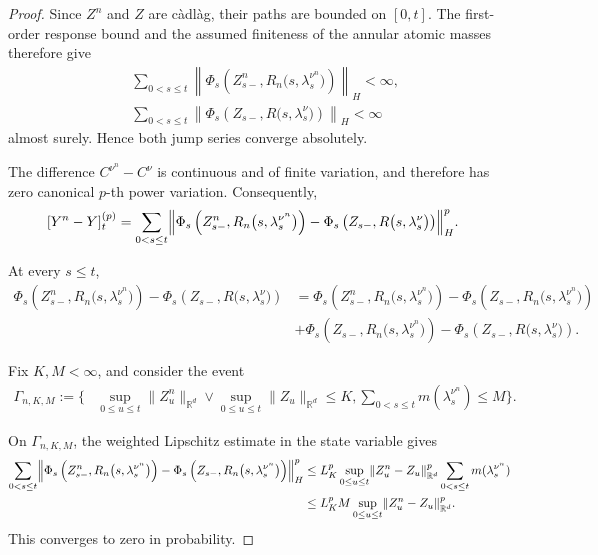 \documentclass[a4paper,10pt]{article}
\begin{document}
\begin{proof}
Since \(Z^n\) and \(Z\) are càdlàg, their paths are bounded on
\([0,t]\). The first-order response bound and the assumed finiteness
of the annular atomic masses therefore give
\[
\begin{aligned}
&\sum_{0<s\le t}
\left\lVert
\Phi_s\left(
Z_{s-}^n,
R_n\bigl(s,\lambda_s^{\nu^n}\bigr)
\right)
\right\rVert_H
<\infty,
\\
&\sum_{0<s\le t}
\left\lVert
\Phi_s\left(
Z_{s-},
R\bigl(s,\lambda_s^\nu\bigr)
\right)
\right\rVert_H
<\infty
\end{aligned}
\]
almost surely. Hence both jump series converge absolutely.

The difference \(C^{\nu^n}-C^\nu\) is continuous and of finite
variation, and therefore has zero canonical \(p\)-th power variation.
Consequently,
\[
\begin{aligned}
[Y^n-Y]^{(p)}_t
&=
\sum_{0<s\le t}
\Bigl\lVert
\Phi_s\left(
Z_{s-}^n,
R_n\bigl(s,\lambda_s^{\nu^n}\bigr)
\right)
-
\Phi_s\left(
Z_{s-},
R\bigl(s,\lambda_s^\nu\bigr)
\right)
\Bigr\rVert_H^p.
\end{aligned}
\]

At every \(s\le t\),
\[
\begin{aligned}
\Phi_s\left(
Z_{s-}^n,
R_n\bigl(s,\lambda_s^{\nu^n}\bigr)
\right)
-
\Phi_s\left(
Z_{s-},
R\bigl(s,\lambda_s^\nu\bigr)
\right)
&=
\Phi_s\left(
Z_{s-}^n,
R_n\bigl(s,\lambda_s^{\nu^n}\bigr)
\right)
-
\Phi_s\left(
Z_{s-},
R_n\bigl(s,\lambda_s^{\nu^n}\bigr)
\right)
\\
&+
\Phi_s\left(
Z_{s-},
R_n\bigl(s,\lambda_s^{\nu^n}\bigr)
\right)
-
\Phi_s\left(
Z_{s-},
R\bigl(s,\lambda_s^\nu\bigr)
\right).
\end{aligned}
\]

Fix \(K,M<\infty\), and consider the event
\[
\begin{aligned}
\Gamma_{n,K,M}
:=
\Biggl\{
&\sup_{0\le u\le t}\lVert Z_u^n\rVert_{\mathbb R^d}
\vee
\sup_{0\le u\le t}\lVert Z_u\rVert_{\mathbb R^d}
\le K,
\sum_{0<s\le t}m(\lambda_s^{\nu^n})
\le M
\Biggr\}.
\end{aligned}
\]

On \(\Gamma_{n,K,M}\), the weighted Lipschitz estimate in the state
variable gives
\[
\begin{aligned}
\sum_{0<s\le t}
\Bigl\lVert
\Phi_s\left(
Z_{s-}^n,
R_n\bigl(s,\lambda_s^{\nu^n}\bigr)
\right)
-
\Phi_s\left(
Z_{s-},
R_n\bigl(s,\lambda_s^{\nu^n}\bigr)
\right)
\Bigr\rVert_H^p
&\le
L_K^p
\sup_{0\le u\le t}
\lVert Z_u^n-Z_u\rVert_{\mathbb R^d}^p
\sum_{0<s\le t}m(\lambda_s^{\nu^n})
\\
&\le
L_K^pM
\sup_{0\le u\le t}
\lVert Z_u^n-Z_u\rVert_{\mathbb R^d}^p.
\end{aligned}
\]
This converges to zero in probability.


\end{proof}
\end{document}
